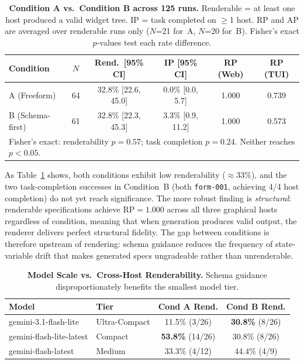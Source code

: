\documentclass{article}
\begin{document}
\begin{table}[h]
\centering
\caption{\textbf{Condition A vs.\ Condition B across 125 runs.} Renderable = at least one host produced a valid widget tree. IP = task completed on $\geq$1 host. RP and AP are averaged over renderable runs only ($N$=21 for~A, $N$=20 for~B). Fisher's exact $p$-values test each rate difference.}
\label{tab:condition_summary}
\begin{tabular}{lccccc}
\toprule
\textbf{Condition} & \textbf{$N$} & \textbf{Rend.\ [95\% CI]} & \textbf{IP [95\% CI]} & \textbf{RP (Web)} & \textbf{RP (TUI)} \\
\midrule
A (Freeform)       & 64 & 32.8\% [22.6, 45.0] & 0.0\% [0.0, 5.7]          & 1.000 & 0.739 \\
B (Schema-first)   & 61 & 32.8\% [22.3, 45.3] & 3.3\% [0.9, 11.2]        & 1.000 & 0.573 \\
\midrule
\multicolumn{6}{l}{\small Fisher's exact: renderability $p=0.57$; task completion $p=0.24$. Neither reaches $p<0.05$.} \\
\bottomrule
\end{tabular}
\end{table}

As Table~\ref{tab:condition_summary} shows, both conditions exhibit low renderability ($\approx$33\%), and the two task-completion successes in Condition~B (both \texttt{form-001}, achieving 4/4 host completion) do not yet reach significance. The more robust finding is \emph{structural}: renderable specifications achieve $\mathrm{RP}=1.000$ across all three graphical hosts regardless of condition, meaning that when generation produces valid output, the renderer delivers perfect structural fidelity. The gap between conditions is therefore upstream of rendering: schema guidance reduces the frequency of state-variable drift that makes generated specs ungradeable rather than unrenderable.

\begin{table}[h]
\centering
\caption{\textbf{Model Scale vs.\ Cross-Host Renderability.} Schema guidance disproportionately benefits the smallest model tier.}
\label{tab:model_scale}
\begin{tabular}{llcc}
\toprule
\textbf{Model} & \textbf{Tier} & \textbf{Cond A Rend.} & \textbf{Cond B Rend.} \\
\midrule
gemini-3.1-flash-lite    & Ultra-Compact & 11.5\% (3/26) & \textbf{30.8\%} (8/26) \\
gemini-flash-lite-latest & Compact       & \textbf{53.8\%} (14/26) & 30.8\% (8/26) \\
gemini-flash-latest      & Medium        & 33.3\% (4/12) & 44.4\% (4/9) \\
\bottomrule
\end{tabular}
\end{table}
\end{document}
